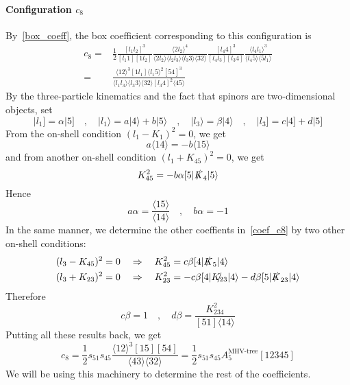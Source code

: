 \paragraph{Configuration $c_{8}$}
By~\cref{box_coeff}, the box coefficient corresponding to this configuration is
\begin{equation*}
\begin{split}
c_8 = & \frac{1}{2}
\frac{[l_1 l_2]^3}{[l_1 1][1l_2]}
\frac{\langle 2 l_2 \rangle^4}{\langle 2l_2 \rangle\langle l_2 l_3\rangle\langle l_3 3 \rangle\langle 32 \rangle}
\frac{[l_4 4 ]^3}{[l_4 l_3][l_3 4]}
\frac{\langle l_4 l_1 \rangle^3}{\langle l_4 5 \rangle\langle 5 l_1\rangle}
\\
= &
\frac{\langle 12 \rangle^3[1l_1 ]\langle l_1 5\rangle^2 [54]^3}{\langle l_1 l_3\rangle\langle l_3 3 \rangle\langle 32 \rangle [l_3 4 ]^2\langle 45\rangle}
\end{split}
\end{equation*}
By the three-particle kinematics and the fact that spinors are two-dimensional objects, set
\begin{equation}\label{coef_c8}
|l_1] = \alpha |5]
\quad,\quad
|l_1\rangle = a|4\rangle + b|5\rangle
\quad,\quad
|l_3\rangle = \beta |4\rangle
\quad,\quad
|l_3] = c|4] + d|5]
\end{equation}
From the on-shell condition $(l_1 - K_1)^2 = 0$, we get
\begin{equation*}
a\langle 14\rangle = -b\langle 15 \rangle
\end{equation*}
and from another on-shell condition $(l_1 + K_{45})^2 = 0$, we get
\begin{equation*}
K_{45}^2 = -b\alpha [5|\slashed{K}_4|5\rangle 
\end{equation*}
Hence
\begin{equation*}
a\alpha = \frac{\langle 15\rangle}{\langle 14\rangle}\quad,\quad
b\alpha = -1
\end{equation*}
In the same manner, we determine the other coeffients in~\cref{coef_c8} by two other on-shell conditions:
\begin{equation*}
\begin{split}
& (l_3 - K_{45})^2 = 0 \quad\Rightarrow\quad
K_{45}^2 = c\beta [4|\slashed{K}_5|4\rangle
\\
& (l_3 + K_{23})^2 = 0 \quad\Rightarrow\quad
K_{23}^2 = -c\beta [4|\slashed{K_{23}}|4\rangle - d\beta [5|\slashed{K}_{23}|4\rangle
\end{split}
\end{equation*}
Therefore
\begin{equation*}
c\beta = 1 \quad,\quad 
d\beta = \frac{K_{234}^2}{[51]\langle 14 \rangle}
\end{equation*}
Putting all these results back, we get
\begin{equation*}
c_8 = \frac{1}{2} s_{51}s_{45} \frac{\langle 12 \rangle^3 [15] [54]}{\langle 43 \rangle\langle 32 \rangle}=\frac{1}{2} s_{51}s_{45} A_5^{\textrm{MHV-tree}}[12345]
\end{equation*}
We will be using this machinery to determine the rest of the coefficients.
%
